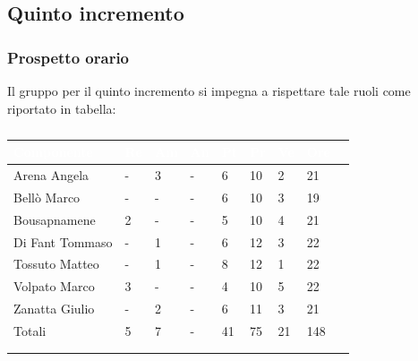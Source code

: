     \subsection{Quinto incremento} 
    {
    \subsubsection{Prospetto orario}
    {
    Il gruppo per il quinto incremento si impegna a rispettare tale ruoli come riportato in tabella:
      \setlength{\freewidth}{\dimexpr\textwidth-30\tabcolsep}
      \renewcommand{\arraystretch}{1.0}
      \setlength{\aboverulesep}{0pt}
      \setlength{\belowrulesep}{0pt}
      \begin{longtable}{C{.4\freewidth} C{.1\freewidth} C{.1\freewidth} C{.1\freewidth} C{.1\freewidth} C{.1\freewidth} C{.1\freewidth} C{.1\freewidth} C{.1\freewidth}}
      \toprule
      \textcolor{white}{\textbf{Componente}}&
      \textcolor{white}{\textbf{Re}}&
      \textcolor{white}{\textbf{Am}}&
      \textcolor{white}{\textbf{An}}&
      \textcolor{white}{\textbf{Pt}}&
      \textcolor{white}{\textbf{Pr}}&
      \textcolor{white}{\textbf{Ve}}&
      \textcolor{white}{\textbf{Ore}}\\
      \toprule
      \endhead

      Arena Angela & - & 3 & -  & 6 & 10 & 2 & 21 \\      
      Bellò Marco & - & - & - & 6 & 10 & 3 & 19 \\      
      Bousapnamene & 2 & - & - & 5 & 10 & 4 & 21 \\      
      Di Fant Tommaso & - & 1 & - & 6 & 12 & 3 & 22 \\      
      Tossuto Matteo & - & 1 & - & 8 & 12 & 1 & 22 \\      
      Volpato Marco & 3 & - & - & 4 & 10 & 5 & 22 \\      
      Zanatta Giulio & - & 2 & - & 6 & 11 & 3 & 21 \\      
      Totali & 5 & 7 & - & 41 & 75 & 21 & 148 \\
      \bottomrule
      \\
      \caption{}
      \end{longtable} 

}}
